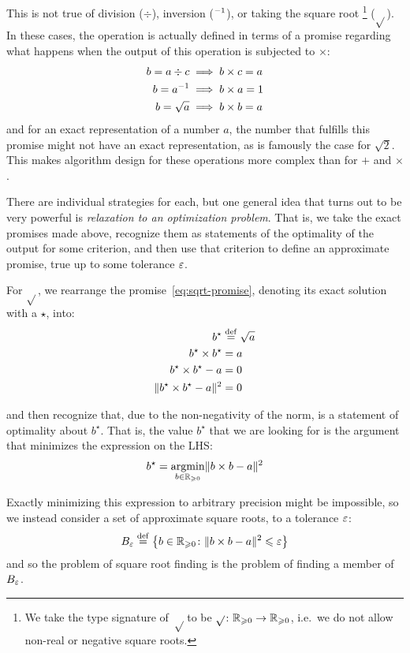 \documentclass[../../thesis.tex]{subfiles}
\begin{document}
This is not true of division ($\div$), inversion ($^{-1}$),
or taking the square root%
\footnote{We take the type signature of $\sqrt$ to be
$\sqrt{}\colon\mathbb{R}_{\geqslant 0}\to\mathbb{R}_{\geqslant 0}$,
i.e.~we do not allow non-real or negative square roots.}
($\sqrt{}$).
In these cases,
the operation is actually defined in terms of a promise regarding what happens
when the output of this operation is subjected to $\times$:
\begin{align}
    b = a \div c &\implies b \times c = a\equationlabel{div-promise}\\
    b = a^{-1} &\implies b \times a = 1\equationlabel{inv-promise} \\
    b = \sqrt{a} &\implies b \times b = a\equationlabel{sqrt-promise}
\end{align}
\noindent and for an exact representation of a number $a$,
the number that fulfills this promise might not have an exact representation,
as is famously the case for $\sqrt{2}$.
This makes algorithm design for these operations more complex than for $+$ and $\times$.

There are individual strategies for each,
but one general idea that turns out to be very powerful is
\emph{relaxation to an optimization problem}.
That is, we take the exact promises made above,
recognize them as statements of the optimality of the output for some criterion,
and then use that criterion to define an approximate promise,
true up to some tolerance $\varepsilon$.

For $\sqrt{}$, we rearrange the promise~\ref{eq:sqrt-promise},
denoting its exact solution with a $\star$, into:
\begin{align}
    b^\star &\defeq \sqrt{a} \\
    b^\star \times b^\star &= a  \\
    b^\star \times b^\star - a &= 0  \\
    \snorm{b^\star \times b^\star - a} &=0\equationlabel{sqrt-opt-criter}
\end{align}

\noindent and then recognize that, due to the non-negativity of the norm,
 is a statement of optimality about $b^\star$.
That is,
the value $b^\star$ that we are looking for is the
argument that minimizes the expression on the LHS:\@
\begin{equation}
	b^\star = \mathop{\mathrm{argmin}}_{b \in \mathbb{R}_{\geqslant 0}} \lVert b \times b - a\rVert^2
\end{equation}

Exactly minimizing this expression to arbitrary precision
might be impossible,
so we instead consider a set of approximate square roots,
to a tolerance $\varepsilon$:
\begin{equation}\equationlabel{sqrteps}
	B_\eps \defeq
	\Set{b \in \R_{\geq 0} \suchthat \snorm{b \times b - a} \leq \eps }
\end{equation}
\noindent and so the problem of square root finding
is the problem of finding a member of $B_\varepsilon$.
\end{document}
